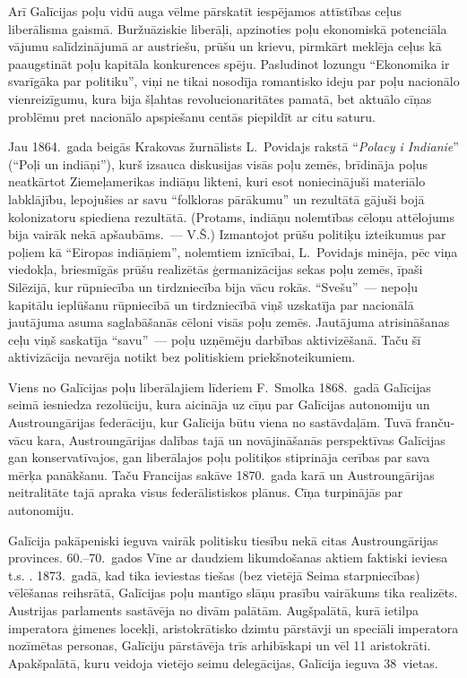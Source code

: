 \documentclass[twoside,a5paper,12pt,fleqn,openany]{extbook}
\newcommand{\pltxti}[1]{\textit{\textpolish{#1}}}
\begin{document}
Arī Galīcijas poļu vidū auga vēlme pārskatīt iespējamos attīstības ceļus liberālisma gaismā. Buržuāziskie liberāļi, apzinoties poļu ekonomiskā potenciāla vājumu salīdzinājumā ar austriešu, prūšu un krievu, pirmkārt meklēja ceļus kā paaugstināt poļu kapitāla konkurences spēju. Pasludinot lozungu ``Ekonomika ir svarīgāka par politiku'', viņi ne tikai nosodīja romantisko ideju par poļu nacionālo vienreizīgumu, kura bija šļahtas revolucionaritātes pamatā, bet aktuālo cīņas problēmu pret nacionālo apspiešanu centās piepildīt ar citu saturu.

Jau 1864.~gada beigās Krakovas žurnālists L.~Povidajs rakstā ``\pltxti{Polacy i Indianie}'' (``Poļi un indiāņi''), kurš izsauca diskusijas visās poļu zemēs, brīdināja poļus neatkārtot Ziemeļamerikas indiāņu likteni, kuri esot noniecinājuši materiālo labklājību, lepojušies ar savu ``folkloras pārākumu'' un rezultātā gājuši bojā kolonizatoru spiediena rezultātā. (Protams, indiāņu nolemtības cēloņu attēlojums bija vairāk nekā apšaubāms.~--- V.Š.) Izmantojot prūšu politiķu izteikumus par poļiem kā ``Eiropas indiāņiem'', nolemtiem iznīcībai, L.~Povidajs minēja, pēc viņa viedokļa, briesmīgās prūšu realizētās ģermanizācijas sekas poļu zemēs, īpaši Silēzijā, kur rūpniecība un tirdzniecība bija vācu rokās. ``Svešu''~--- nepoļu kapitālu ieplūšanu rūpniecībā un tirdzniecībā viņš uzskatīja par nacionālā jautājuma asuma saglabāšanās cēloni visās poļu zemēs. Jautājuma atrisināšanas ceļu viņš saskatīja ``savu''~--- poļu uzņēmēju darbības aktivizēšanā. Taču šī aktivizācija nevarēja notikt bez politiskiem priekšnoteikumiem.

Viens no Galīcijas poļu liberālajiem līderiem F.~Smolka 1868.~gadā Galīcijas seimā iesniedza rezolūciju, kura aicināja uz cīņu par Galīcijas autonomiju un Austroungārijas federāciju, kur Galīcija būtu viena no sastāvdaļām. Tuvā franču-vācu kara, Austroungārijas dalības tajā un novājināšanās perspektīvas Galīcijas gan konservatīvajos, gan liberālajos poļu politiķos stiprināja cerības par sava mērķa panākšanu. Taču Francijas sakāve 1870.~gada karā un Austroungārijas neitralitāte tajā apraka visus federālistiskos plānus. Cīņa turpinājās par autonomiju.

Galīcija pakāpeniski ieguva vairāk politisku tiesību nekā citas Austroungārijas provinces. 60.--70.~gados Vīne ar daudziem likumdošanas aktiem faktiski ieviesa t.s. . 1873.~gadā, kad tika ieviestas tiešas (bez vietējā Seima starpniecības) vēlēšanas reihsrātā, Galīcijas poļu mantīgo slāņu prasību vairākums tika realizēts. Austrijas parlaments sastāvēja no divām palātām. Augšpalātā, kurā ietilpa imperatora ģimenes locekļi, aristokrātisko dzimtu pārstāvji un speciāli imperatora nozīmētas personas, Galīciju pārstāvēja trīs arhibīskapi un vēl 11 aristokrāti. Apakšpalātā, kuru veidoja vietējo seimu delegācijas, Galīcija ieguva 38~vietas.
\end{document}
